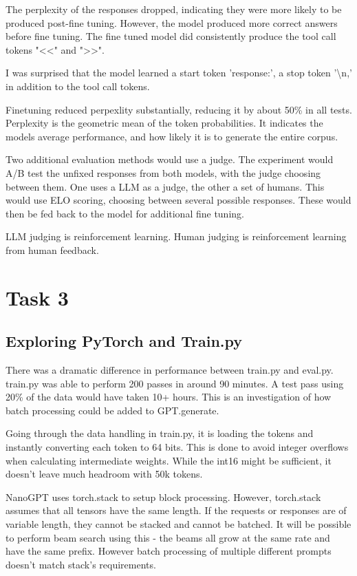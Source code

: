 \documentclass[11pt]{article}
\begin{document}
The perplexity of the responses dropped, indicating they were more likely to be produced post-fine tuning. However, the model produced more correct answers before fine tuning. The fine tuned model did consistently produce the tool call tokens "\textless\textless" and "\textgreater\textgreater".

I was surprised that the model learned a start token 'response:', a stop token '\textbackslash n,' in addition to the tool call tokens.

Finetuning reduced perpexlity substantially, reducing it by about 50\% in all tests. Perplexity is the geometric mean of the token probabilities. It indicates the models average performance, and how likely it is to generate the entire corpus.

Two additional evaluation methods would use a judge. The experiment would A/B test the unfixed responses from both models, with the judge choosing between them. One uses a LLM as a judge, the other a set of humans. This would use ELO scoring, choosing between several possible responses. These would then be fed back to the model for additional fine tuning.

LLM judging is reinforcement learning. Human judging is reinforcement learning from human feedback.

\section{Task 3}

\subsection{Exploring PyTorch and Train.py}

There was a dramatic difference in performance between train.py and eval.py. train.py was able to perform 200 passes in around 90 minutes. A test pass using 20\% of the data would have taken 10+ hours. This is an investigation of how batch processing could be added to GPT.generate.

Going through the data handling in train.py, it is loading the tokens and instantly converting each token to 64 bits. This is done to avoid integer overflows when calculating intermediate weights. While the int16 might be sufficient, it doesn't leave much headroom with 50k tokens.

NanoGPT uses torch.stack to setup block processing. However, torch.stack assumes that all tensors have the same length. If the requests or responses are of variable length, they cannot be stacked and cannot be batched. It will be possible to perform beam search using this - the beams all grow at the same rate and have the same prefix. However batch processing of multiple different prompts doesn't match stack's requirements.
\end{document}
